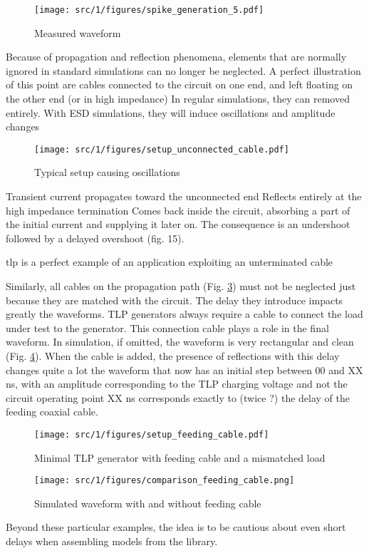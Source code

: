 \begin{figure}[!h]
  \centering
  \texttt{[image: src/1/figures/spike\_generation\_5.pdf]}
  \caption{Measured waveform}
  \label{fig:spike-step-4}
\end{figure}

Because of propagation and reflection phenomena, elements that are normally ignored in standard simulations can no longer be neglected.
A perfect illustration of this point are cables connected to the circuit on one end, and left floating on the other end (or in high impedance)
In regular simulations, they can removed entirely.
With ESD simulations, they will induce oscillations and amplitude changes

\begin{figure}[!h]
  \centering
  \texttt{[image: src/1/figures/setup\_unconnected\_cable.pdf]}
  \caption{Typical setup causing oscillations}
  \label{fig:setup-unconnected-cable}
\end{figure}

Transient current propagates toward the unconnected end
Reflects entirely at the high impedance termination
Comes back inside the circuit, absorbing a part of the initial current and supplying it later on.
The consequence is an undershoot followed by a delayed overshoot (fig. 15).

\gls{tlp} is a perfect example of an application exploiting an unterminated cable

Similarly, all cables on the propagation path (Fig. \ref{fig:setup-feeding-cable}) must not be neglected just because they are matched with the circuit.
The delay they introduce impacts greatly the waveforms.
TLP generators always require a cable to connect the load under test to the generator.
This connection cable plays a role in the final waveform.
In simulation, if omitted, the waveform is very rectangular and clean (Fig. \ref{fig:comparison-feeding-cable}).
When the cable is added, the presence of reflections with this delay changes quite a lot the waveform that now has an initial step between 00 and XX ns, with an amplitude corresponding to the TLP charging voltage and not the circuit operating point
XX ns corresponds exactly to (twice ?) the delay of the feeding coaxial cable.

\begin{figure}[!h]
  \centering
  \texttt{[image: src/1/figures/setup\_feeding\_cable.pdf]}
  \caption{Minimal TLP generator with feeding cable and a mismatched load}
  \label{fig:setup-feeding-cable}
\end{figure}

\begin{figure}[!h]
  \centering
  \texttt{[image: src/1/figures/comparison\_feeding\_cable.png]}
  \caption{Simulated waveform with and without feeding cable}
  \label{fig:comparison-feeding-cable}
\end{figure}

Beyond these particular examples, the idea is to be cautious about even short delays when assembling models from the library.
